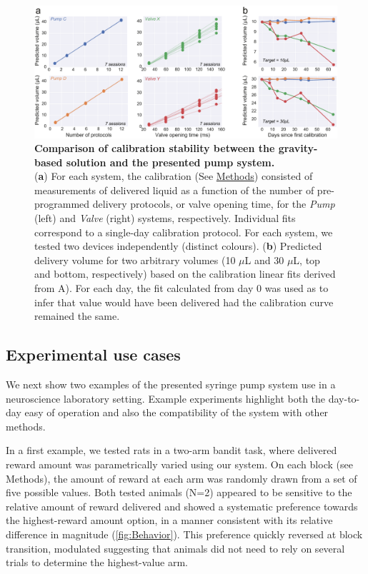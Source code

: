 \begin{figure} 
	\centering
	\includegraphics[width=1.0\linewidth]{Figures/Artboard 2.pdf}
	\caption{\textbf{Comparison of calibration stability between the gravity-based solution and the presented pump system.}\\
		(\textbf{a}) For each system, the calibration (See \hyperref[s:methods]{Methods}) consisted of measurements of delivered liquid as a function of the number of pre-programmed delivery protocols, or valve opening time, for the \textit{Pump} (left) and \textit{Valve} (right) systems, respectively. Individual fits correspond to a single-day calibration protocol. For each system, we tested two devices independently (distinct colours). (\textbf{b}) Predicted delivery volume for two arbitrary volumes (10 $\mu$L and 30 $\mu$L, top and bottom, respectively) based on the calibration linear fits derived from A). For each day, the fit calculated from day 0 was used as to infer that value would have been delivered had the calibration curve remained the same.}
	\label{fig:PumpVsValve} 
\end{figure}


\subsection*{Experimental use cases}

We next show two examples of the presented syringe pump system use in a neuroscience laboratory setting. Example experiments highlight both the day-to-day easy of operation and also the compatibility of the system with other methods.

In a first example, we tested rats in a two-arm bandit task, where delivered reward amount was parametrically varied using our system. On each block (see Methods), the amount of reward at each arm was randomly drawn from a set of five possible values. Both tested animals (N=2) appeared to be sensitive to the relative amount of reward delivered and showed a systematic preference towards the highest-reward amount option, in a manner consistent with its relative difference in magnitude (\cref{fig:Behavior}). This preference quickly reversed at block transition, modulated suggesting that animals did not need to rely on several trials to determine the highest-value arm.

